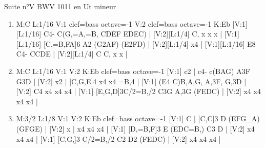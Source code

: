 \documentclass[a4paper,twoside]{article}
\begin{document}
\begin{center}
\Large Suite n°V BWV 1011 en Ut mineur
\end{center}

\vspace{3cm}

%
%
\large
\settowidth{\titlelen}{Allemande}
\addtolength{\titlelen}{0.5em}
\setlength{\titleseplen}{1cm}
\begin{enumerate}
  \item {}
\begin{abcsvg}
  M:C
  L:1/16
  V:1 clef=bass octave=-1
  V:2 clef=bass octave=-1
  K:Eb
  [V:1][L:1/16] C4- C(G,=A,=B, CDEF EDEC) |
  [V:2][L:1/4]  C,  x x x |
  [V:1][L:1/16] [C,=B,FA]6 A2 (G2AF) (E2FD) |
  [V:2][L:1/4]  x4 |
  [V:1][L:1/16] E8 C4- CCDE |
  [V:2][L:1/4]  C C, x x |
\end{abcsvg}
\makebox[2cm][l]{ \dotfill\ \pageref{Vprelude}}
\par\vspace{\titleseplen}

  \item {}
\begin{abcsvg}
  M:C
  L:1/16
  V:1
  V:2
  K:Eb clef=bass octave=-1
  [V:1] c2 | c4- c(BAG) A3F G3D |
  [V:2] x2 | [C,G,E]4 x4 x4 =B,4 |
  [V:1] (E4 C)B,A,G, A,3F, G,3D |
  [V:2] C4 x4 x4 x4 |
  [V:1]  [E,G,D]3C/2=B,/2 C3G A,3G (FEDC) |
  [V:2] x4 x4 x4 x4 |
\end{abcsvg}
\makebox[2cm][l]{ \dotfill\ \pageref{Vallemande}}
\par\vspace{\titleseplen}

  \item {}
\begin{abcsvg}
  M:3/2
  L:1/8
  V:1
  V:2
  K:Eb clef=bass octave=-1
  [V:1] C | [C,C]3 D (EFG_A) (GFGE) |
  [V:2] x | x4 x4 x4 |
  [V:1] [D,=B,F]3 E (EDC=B,) C3 D |
  [V:2] x4 x4 x4 |
  [V:1] [C,G,]3 C/2=B,/2 C2 D2 (FEDC) |
  [V:2] x4 x4 x4 |
\end{abcsvg}
\makebox[2cm][l]{ \dotfill\ \pageref{Vcourante}}
\par\vspace{\titleseplen}


\end{enumerate}
\end{document}
